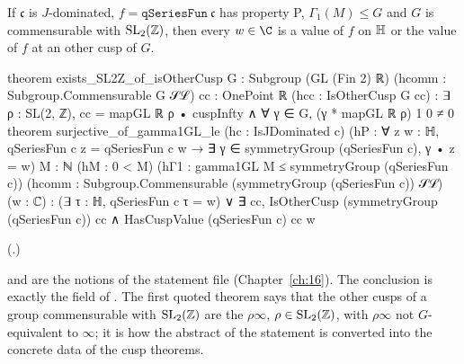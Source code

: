 \begin{theorem}\label{ch19:thm:surj}
If $\mathfrak c$ is $J$-dominated, $f=\mathtt{qSeriesFun}\ \mathfrak c$ has property P, $\Gamma_1(M)\le G$ and $G$ is commensurable with $\mathrm{SL}_2(\mathbb{Z})$, then every $w\in\C$ is a value of $f$ on
$\mathbb{H}$ or the value of $f$ at an other cusp of $G$.
\end{theorem}
\begin{leancode}
theorem exists_SL2Z_of_isOtherCusp {G : Subgroup (GL (Fin 2) ℝ)}
    (hcomm : Subgroup.Commensurable G 𝒮ℒ) {cc : OnePoint ℝ} (hcc : IsOtherCusp G cc) :
    ∃ ρ : SL(2, ℤ), cc = mapGL ℝ ρ • cuspInfty ∧ ∀ γ ∈ G, (γ * mapGL ℝ ρ) 1 0 ≠ 0
theorem surjective_of_gamma1GL_le (hc : IsJDominated c)
    (hP : ∀ z w : ℍ, qSeriesFun c z = qSeriesFun c w →
      ∃ γ ∈ symmetryGroup (qSeriesFun c), γ • z = w)
    {M : ℕ} (hM : 0 < M) (hΓ1 : gamma1GL M ≤ symmetryGroup (qSeriesFun c))
    (hcomm : Subgroup.Commensurable (symmetryGroup (qSeriesFun c)) 𝒮ℒ) (w : ℂ) :
    (∃ τ : ℍ, qSeriesFun c τ = w) ∨
      ∃ cc, IsOtherCusp (symmetryGroup (qSeriesFun c)) cc ∧ HasCuspValue (qSeriesFun c) cc w
\end{leancode}
(.)
\begin{dictionary}
 and  are the notions of the statement file (Chapter~\ref{ch:16}).  The conclusion is exactly the field
 of .  The first quoted theorem says that the other cusps of a group commensurable with
$\mathrm{SL}_2(\mathbb{Z})$ are the $\rho\infty$, $\rho\in\mathrm{SL}_2(\mathbb{Z})$, with $\rho\infty$ not $G$-equivalent to $\infty$; it is how the abstract  of the
statement is converted into the concrete data of the cusp theorems.
\end{dictionary}
